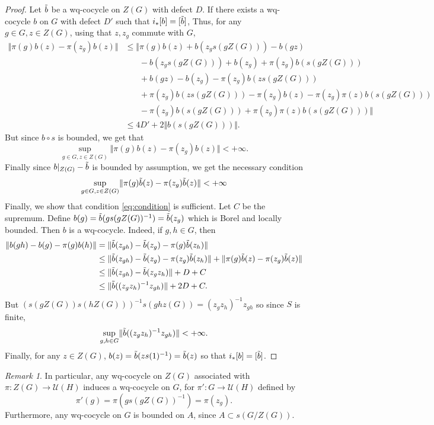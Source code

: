 \documentclass{article}
\theoremstyle{definition}
\theoremstyle{remark}
\newtheorem{remark}[theorem]{Remark}
\numberwithin{equation}{section}
\begin{document}
\begin{proof}
    Let $\Tilde{b}$ be a wq-cocycle on $Z(G)$ with defect $D$. If there exists a wq-cocycle $b$ on $G$ with defect $D'$ such that $i_*[b]=[\Tilde{b}]$,
    Thus, for any $g\in G,z\in Z(G)$, using that $z,z_g$ commute with $G$, \begin{align*}
        \Vert \pi(g)b(z)-\pi(z_g)b(z)\Vert & \leq \Vert \pi(g)b(z)+b(z_gs(gZ(G)))-b(gz)\\
        & \phantom{{}\leq \Vert} -b(z_gs(gZ(G)))+b(z_g)+\pi(z_g)b(s(gZ(G)))\\
        & \phantom{{}\leq \Vert} +b(gz)-b(z_g)-\pi(z_g)b(zs(gZ(G)))\\
        & \phantom{{}\leq \Vert} +\pi(z_g)b(zs(gZ(G)))-\pi(z_g)b(z)-\pi(z_g)\pi(z)b(s(gZ(G)))\\
        & \phantom{{}\leq \Vert}- \pi(z_g)b(s(gZ(G)))+\pi(z_g)\pi(z)b(s(gZ(G))) \Vert\\
        & \leq 4D'+ 2\Vert b(s(gZ(G)))\Vert.
    \end{align*}But since $b\circ s$ is bounded, we get that $$\underset{g\in G,z\in Z(G)}{\sup}\Vert \pi(g)b(z)-\pi(z_g)b(z)\Vert<+\infty.$$Finally since $b\vert_{Z(G)}-\Tilde{b}$ is bounded by assumption, we get the necessary condition\begin{equation}\label{eq:condition}
        \underset{g\in G,z\in Z(G)}{\sup}\Vert \pi(g)\Tilde{b}(z)-\pi(z_g)\Tilde{b}(z) \Vert<+\infty
    \end{equation}
    Finally, we show that condition \eqref{eq:condition} is sufficient. Let $C$ be the supremum. Define $b(g)=\Tilde{b}(gs(gZ(G))^{-1})=\Tilde{b}(z_g)$ which is Borel and locally bounded. Then $b$ is a wq-cocycle. Indeed, if $g,h\in G$, then \begin{align*}
    \Vert b(gh)-b(g)-\pi(g)b(h)\Vert & = \Vert \Tilde{b}(z_{gh})-\Tilde{b}(z_g)-\pi(g)\Tilde{b}(z_h)\Vert \\
    & \leq \Vert \Tilde{b}(z_{gh})-\Tilde{b}(z_g)-\pi(z_g)\Tilde{b}(z_h)\Vert+\Vert  \pi(g)\Tilde{b}(z)-\pi(z_g)\Tilde{b}(z)\Vert\\
    & \leq \Vert  \Tilde{b}(z_{gh})-\Tilde{b}(z_gz_h)\Vert + D + C\\
    & \leq \Vert  \Tilde{b}((z_gz_h)^{-1}z_{gh})\Vert + 2D+C.
    \end{align*}But $(s(gZ(G))s(hZ(G)))^{-1}s(ghz(G))=(z_gz_h)^{-1}z_{gh}$ so since $S$ is finite, $$ \underset{g,h\in G}{\sup}\Vert  \Tilde{b}((z_gz_h)^{-1}z_{gh})\Vert<+\infty.$$
    Finally, for any $z\in Z(G)$, $b(z)=\Tilde{b}(zs(1)^{-1})=\Tilde{b}(z)$ so that $i_*[b]=[\Tilde{b}]$.
\end{proof}
\begin{remark}In particular, any wq-cocycle on $Z(G)$ associated with $\pi:Z(G)\to \mathcal{U}(H)$ induces a wq-cocycle on $G$, for $\pi':G\to \mathcal{U}(H)$ defined by $$\pi'(g)=\pi(gs(gZ(G))^{-1})=\pi(z_g).$$
Furthermore, any wq-cocycle on $G$ is bounded on $A$, since $A\subset s(G/Z(G))$.
\end{remark}






\end{document}
